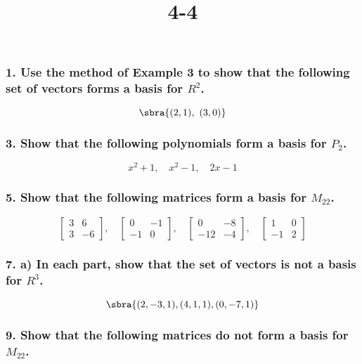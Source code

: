 \documentclass{article}
\title{ 4-4 }
\begin{document}
\maketitle
\pagebreak

\subsubsection*{ 1. Use the method of Example 3 to show that the following set of vectors forms a basis for $R^2$. }

\[ \sbra{ (2, 1),\ (3, 0) } \]
\vfill

\subsubsection*{ 3. Show that the following polynomials form a basis for $P_2$. }

\[ x^2 + 1, \quad x^2 - 1, \quad 2x - 1 \]
\vfill

\pagebreak
\subsubsection*{ 5. Show that the following matrices form a basis for $M_{22}$. }

\[ \begin{bmatrix} 3 & 6 \\ 3 & -6 \end{bmatrix}, \quad \begin{bmatrix} 0 & -1 \\ -1 & 0 \end{bmatrix}, \quad \begin{bmatrix} 0 & -8 \\ -12 & -4 \end{bmatrix}, \quad \begin{bmatrix} 1 & 0 \\ -1 & 2 \end{bmatrix} \]
\vfill

\subsubsection*{ 7. a) In each part, show that the set of vectors is not a basis for $R^3$. }

\[\sbra{(2, -3, 1), (4, 1, 1), (0, -7, 1)}\]
\vfill

\pagebreak
\subsubsection*{ 9. Show that the following matrices do not form a basis for $M_{22}$. }
\end{document}
